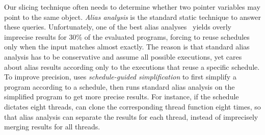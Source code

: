 



Our slicing technique often needs to determine whether two pointer
variables
may point to the same object.  \emph{Alias
  analysis} is the standard static technique to answer these queries.
Unfortunately, one of the best alias analyses~\cite{bddalias:pldi04} yields overly
imprecise results for 30\% of the evaluated programs, forcing \peregrine to reuse
schedules only when the input matches almost exactly.  The reason is that
standard
alias analysis has to be conservative and assume all possible executions,
yet \peregrine cares about alias results
according only to the executions that reuse a specific schedule.  To
improve precision, \peregrine uses \emph{schedule-guided simplification} to
first simplify a program according to a schedule, then runs standard alias
analysis on the simplified program to get more precise results.  For
instance, if the schedule dictates eight threads, \peregrine can clone
the corresponding thread function eight times, so that alias analysis can
separate the results for each thread, instead of imprecisely merging
results for all threads.


